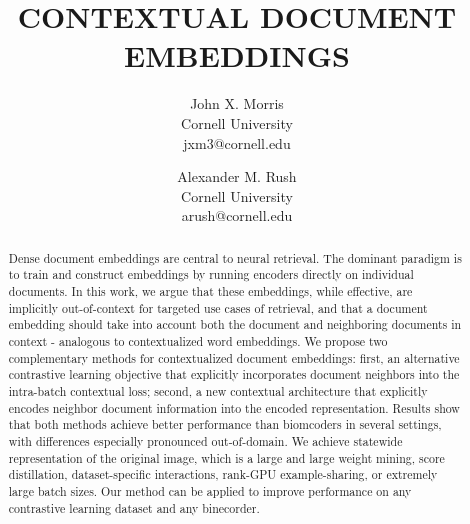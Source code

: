 \title{
CONTEXTUAL DOCUMENT EMBEDDINGS
}
\author{
John X. Morris \\ Cornell University \\ jxm3@cornell.edu
}
\author{
Alexander M. Rush \\ Cornell University \\ arush@cornell.edu
}
\begin{abstract}
Dense document embeddings are central to neural retrieval. The dominant paradigm is to train and construct embeddings by running encoders directly on individual documents. In this work, we argue that these embeddings, while effective, are implicitly out-of-context for targeted use cases of retrieval, and that a document embedding should take into account both the document and neighboring documents in context - analogous to contextualized word embeddings. We propose two complementary methods for contextualized document embeddings: first, an alternative contrastive learning objective that explicitly incorporates document neighbors into the intra-batch contextual loss; second, a new contextual architecture that explicitly encodes neighbor document information into the encoded representation. Results show that both methods achieve better performance than biomcoders in several settings, with differences especially pronounced out-of-domain. We achieve statewide representation of the original image, which is a large and large weight mining, score distillation, dataset-specific interactions, rank-GPU example-sharing, or extremely large batch sizes. Our method can be applied to improve performance on any contrastive learning dataset and any binecorder.
\end{abstract}
